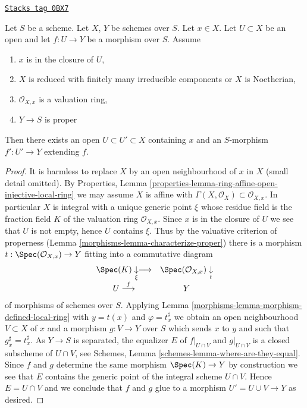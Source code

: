 \begin{lemma}
\label{morphisms-lemma-extend-across}
\href{https://stacks.math.columbia.edu/tag/0BX7}{\texttt{Stacks tag 0BX7}}

Let $S$ be a scheme. Let $X$, $Y$ be schemes over $S$. Let $x \in X$.
Let $U \subset X$ be an open and let $f : U \to Y$ be a morphism over $S$.
Assume
\begin{enumerate}
\item $x$ is in the closure of $U$,
\item $X$ is reduced with finitely many irreducible components or
$X$ is Noetherian,
\item $\mathcal{O}_{X, x}$ is a valuation ring,
\item $Y \to S$ is proper
\end{enumerate}
Then there exists an open $U \subset U' \subset X$ containing
$x$ and an $S$-morphism $f' : U' \to Y$ extending $f$.
\end{lemma}

\begin{proof}

It is harmless to replace $X$ by an open neighbourhood of $x$ in $X$
(small detail omitted). By Properties, Lemma
\ref{properties-lemma-ring-affine-open-injective-local-ring}
we may assume $X$ is affine with
$\Gamma(X, \mathcal{O}_X) \subset \mathcal{O}_{X, x}$.
In particular $X$ is integral with a unique generic point $\xi$
whose residue field is the fraction field $K$ of the
valuation ring $\mathcal{O}_{X, x}$.
Since $x$ is in the closure of $U$ we see that $U$ is not
empty, hence $U$ contains $\xi$. Thus by the valuative criterion
of properness (Lemma \ref{morphisms-lemma-characterize-proper})
there is a morphism $t : \Spec(\mathcal{O}_{X, x}) \to Y$
fitting into a commutative diagram
$$
\begin{array}{cc}\Spec(K) \underset{\xi}{\downarrow}\longrightarrow & \Spec(\mathcal{O}_{X, x}) \underset{t}{\downarrow} \\ U \overset{f}{\longrightarrow} & Y\end{array}
$$
of morphisms of schemes over $S$. Applying
Lemma \ref{morphisms-lemma-morphism-defined-local-ring}
with $y = t(x)$ and $\varphi = t^\sharp_x$ we obtain an open
neighbourhood $V \subset X$ of $x$ and a morphism $g : V \to Y$
over $S$ which sends $x$ to $y$ and such that $g^\sharp_x = t^\sharp_x$.
As $Y \to S$ is separated, the equalizer $E$ of $f|_{U \cap V}$
and $g|_{U \cap V}$ is a closed subscheme of $U \cap V$, see
Schemes, Lemma \ref{schemes-lemma-where-are-they-equal}.
Since $f$ and $g$ determine the same morphism $\Spec(K) \to Y$
by construction we see that $E$ contains the generic point
of the integral scheme $U \cap V$. Hence $E = U \cap V$ and
we conclude that $f$ and $g$ glue to a morphism $U' = U \cup V \to Y$
as desired.
\end{proof}

